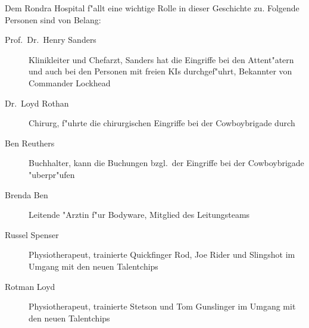 
Dem Rondra Hospital f"allt eine wichtige Rolle in dieser Geschichte zu. Folgende Personen sind von Belang:

\begin{description}
    \item[Prof.~Dr.~Henry Sanders] Klinikleiter und Chefarzt, Sanders hat die Eingriffe bei den Attent"atern und auch 
        bei den Personen mit freien KIs durchgef"uhrt, Bekannter von Commander Lockhead
    \item[Dr.~Loyd Rothan] Chirurg, f"uhrte die chirurgischen Eingriffe bei der Cowboybrigade durch
    \item[Ben Reuthers] Buchhalter, kann die Buchungen bzgl.~der Eingriffe bei der Cowboybrigade "uberpr"ufen
    \item[Brenda Ben] Leitende "Arztin f"ur Bodyware, Mitglied des Leitungsteams
    \item[Russel Spenser] Physiotherapeut, trainierte Quickfinger Rod, Joe Rider und Slingshot im Umgang mit den neuen 
        Talentchips
    \item[Rotman Loyd] Physiotherapeut, trainierte Stetson und Tom Gunslinger im Umgang mit den neuen Talentchips
\end{description}
